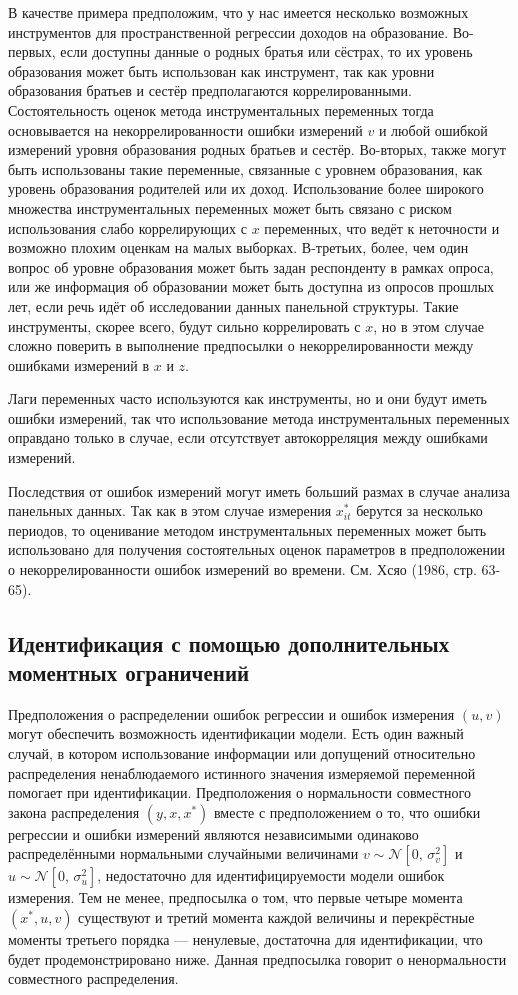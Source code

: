В качестве примера предположим, что у нас имеется несколько возможных инструментов для пространственной регрессии доходов на образование. Во-первых, если доступны данные о родных братья или сёстрах, то их уровень образования может быть использован как инструмент, так как уровни образования братьев и сестёр предполагаются коррелированными. Состоятельность оценок метода инструментальных переменных тогда основывается на некоррелированности ошибки измерений $v$ и любой ошибкой измерений уровня образования родных братьев и сестёр. Во-вторых, также могут быть использованы такие переменные, связанные с уровнем образования, как уровень образования родителей или их доход. Использование более широкого множества инструментальных переменных может быть связано с риском использования слабо коррелирующих с $x$ переменных, что ведёт к неточности и возможно плохим оценкам на малых выборках. В-третьих, более, чем один вопрос об уровне образования может быть задан респонденту в рамках опроса, или же информация об образовании может быть доступна из опросов прошлых лет, если речь идёт об исследовании данных панельной структуры. Такие инструменты, скорее всего, будут сильно коррелировать с $x$, но в этом случае сложно поверить в выполнение предпосылки о некоррелированности между ошибками измерений в $x$ и $z$.
 
Лаги переменных часто используются как инструменты, но и они будут иметь ошибки измерений, так что использование метода инструментальных переменных оправдано только в случае, если отсутствует автокорреляция между ошибками измерений.

Последствия от ошибок измерений могут иметь больший размах в случае анализа панельных данных. Так как в этом случае измерения $x^*_{it}$ берутся за несколько периодов, то оценивание методом инструментальных переменных может быть использовано для получения состоятельных оценок параметров в предположении о некоррелированности ошибок измерений во времени. См. Хсяо (1986, стр. 63-65).

\subsection{Идентификация с помощью дополнительных моментных ограничений} 

Предположения о распределении ошибок регрессии и ошибок измерения $(u, v)$ могут обеспечить возможность идентификации модели. Есть один важный случай, в котором использование информации или допущений относительно распределения ненаблюдаемого истинного значения измеряемой переменной помогает при идентификации. Предположения о нормальности совместного закона распределения $(y, x, x^*)$ вместе с предположением о то, что ошибки регрессии и ошибки измерений являются независимыми одинаково распределёнными нормальными случайными величинами  $v\sim \mathcal{N}[0, \, \sigma^2_v]$ и   $u\sim \mathcal{N}[0, \, \sigma^2_u]$, недостаточно для идентифицируемости модели ошибок измерения. Тем не менее, предпосылка о том, что первые четыре момента $(x^*, u, v)$ существуют и третий момента каждой величины и перекрёстные моменты третьего порядка --- ненулевые,  достаточна для идентификации, что будет продемонстрировано ниже. Данная предпосылка говорит о ненормальности совместного распределения.

